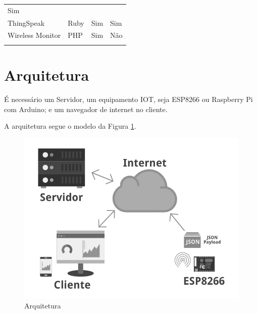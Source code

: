 \begin{longtable}[c]{@{}llll@{}}
\begin{minipage}[t]{0.12\columnwidth}
Sim
\end{minipage}
\\\addlinespace
\begin{minipage}[t]{0.22\columnwidth}\raggedright
ThingSpeak
\end{minipage} & \begin{minipage}[t]{0.28\columnwidth}\raggedright
Ruby
\end{minipage} & \begin{minipage}[t]{0.25\columnwidth}\raggedright
Sim
\end{minipage} & \begin{minipage}[t]{0.12\columnwidth}\raggedright
Sim
\end{minipage}
\\\addlinespace
\begin{minipage}[t]{0.22\columnwidth}\raggedright
Wireless Monitor
\end{minipage} & \begin{minipage}[t]{0.28\columnwidth}\raggedright
PHP
\end{minipage} & \begin{minipage}[t]{0.25\columnwidth}\raggedright
Sim
\end{minipage} & \begin{minipage}[t]{0.12\columnwidth}\raggedright
Não
\end{minipage}
\\\addlinespace
\bottomrule
\end{longtable}

\section{Arquitetura}\label{arquitetura}

É necessário um Servidor, um equipamento IOT, seja ESP8266 ou Raspberry
Pi com Arduino; e um navegador de internet no cliente.

A arquitetura segue o modelo da Figura \ref{fig:arquitetura}.

\begin{figure}[h]
    \centering
    \includegraphics[scale=0.45]{img/arquitetura-grey.png}
    \caption{Arquitetura} \label{fig:arquitetura}
\end{figure}


